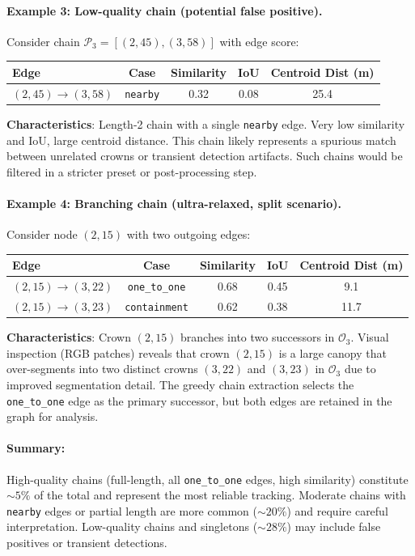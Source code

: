 \paragraph{Example 3: Low-quality chain (potential false positive).}
Consider chain $\mathcal{P}_3 = [(2, 45), (3, 58)]$ with edge score:
\begin{center}
\begin{tabular}{lcccc}
\toprule
Edge & Case & Similarity & IoU & Centroid Dist (m) \\
\midrule
$(2,45) \to (3,58)$ & \texttt{nearby} & 0.32 & 0.08 & 25.4 \\
\bottomrule
\end{tabular}
\end{center}
\textbf{Characteristics}: Length-2 chain with a single \texttt{nearby} edge. Very low similarity and IoU, large centroid distance. This chain likely represents a spurious match between unrelated crowns or transient detection artifacts. Such chains would be filtered in a stricter preset or post-processing step.

\paragraph{Example 4: Branching chain (ultra-relaxed, split scenario).}
Consider node $(2, 15)$ with two outgoing edges:
\begin{center}
\begin{tabular}{lcccc}
\toprule
Edge & Case & Similarity & IoU & Centroid Dist (m) \\
\midrule
$(2,15) \to (3,22)$ & \texttt{one\_to\_one} & 0.68 & 0.45 & 9.1 \\
$(2,15) \to (3,23)$ & \texttt{containment} & 0.62 & 0.38 & 11.7 \\
\bottomrule
\end{tabular}
\end{center}
\textbf{Characteristics}: Crown $(2,15)$ branches into two successors in $\mathcal{O}_3$. Visual inspection (RGB patches) reveals that crown $(2,15)$ is a large canopy that over-segments into two distinct crowns $(3,22)$ and $(3,23)$ in $\mathcal{O}_3$ due to improved segmentation detail. The greedy chain extraction selects the \texttt{one\_to\_one} edge as the primary successor, but both edges are retained in the graph for analysis.

\paragraph{Summary:} High-quality chains (full-length, all \texttt{one\_to\_one} edges, high similarity) constitute $\sim 5\%$ of the total and represent the most reliable tracking. Moderate chains with \texttt{nearby} edges or partial length are more common ($\sim 20\%$) and require careful interpretation. Low-quality chains and singletons ($\sim 28\%$) may include false positives or transient detections.


